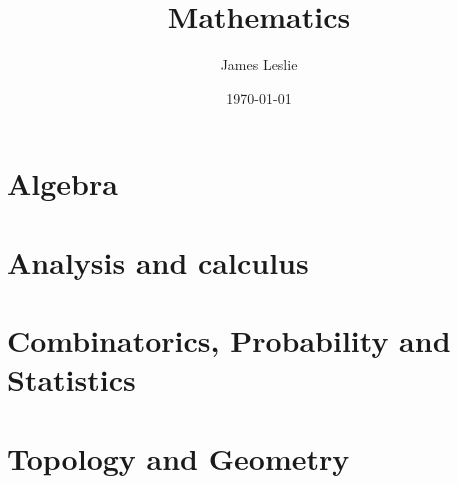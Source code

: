 \documentclass[12pt]{report}
\title{Mathematics}
\author{James Leslie}
\date{\today}
\begin{document}
\maketitle
\tableofcontents



\part{Algebra}















\part{Analysis and calculus}

















\part{Combinatorics, Probability and Statistics}






\part{Topology and Geometry}

\end{document}
